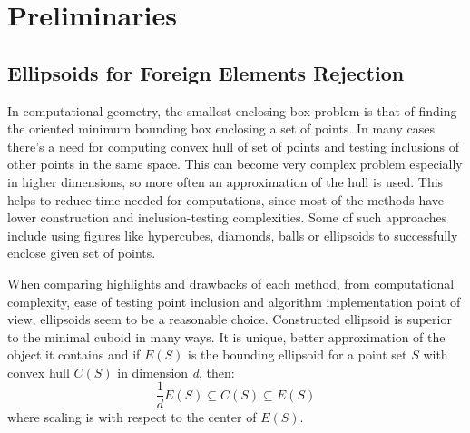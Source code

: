 \documentclass{llncs}
\begin{document}



\section{Preliminaries}
  \label{sec:preliminaries}



\subsection{Ellipsoids for Foreign Elements Rejection}


In computational geometry, the smallest enclosing box problem is that of finding the oriented minimum bounding box enclosing a set of points. In many cases there's a need for computing convex hull of set of points and testing inclusions of other points in the same space. This can become very complex problem especially in higher dimensions, so more often an approximation of the hull is used. This helps to reduce time needed for computations, since most of the methods have lower construction and inclusion-testing complexities. Some of such approaches include using figures like hypercubes, diamonds, balls or ellipsoids to successfully enclose given set of points.

When comparing highlights and drawbacks of each method, from computational complexity, ease of testing point inclusion and algorithm implementation point of view, ellipsoids seem to be a reasonable choice. Constructed ellipsoid is superior to the minimal cuboid in many ways. It is unique, better approximation of the object it contains and if $E(S)$ is the bounding ellipsoid for a point set $S$ with convex hull $C(S)$ in dimension \textit{d}, then:
\[ \frac{1}{d}E(S) \subseteq C(S) \subseteq E(S) \]
where scaling is with respect to the center of $E(S)$.
\end{document}
